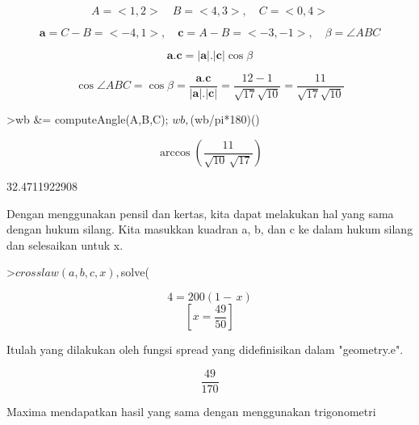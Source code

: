 \documentclass[a4paper,10pt]{article}
\begin{document}
\begin{eulernotebook}
\begin{eulercomment}
\begin{eulercomment}
\begin{eulercomment}
\begin{eulercomment}
\begin{eulercomment}
\end{eulercomment}
\begin{eulerformula}
\[
A=<1,2>\quad B=<4,3>,\quad C=<0,4>
\]
\end{eulerformula}
\begin{eulerformula}
\[
\mathbf{a}=C-B=<-4,1>,\quad \mathbf{c}=A-B=<-3,-1>,\quad \beta=\angle ABC
\]
\end{eulerformula}
\begin{eulerformula}
\[
\mathbf{a}.\mathbf{c}=|\mathbf{a}|.|\mathbf{c}|\cos \beta
\]
\end{eulerformula}
\begin{eulerformula}
\[
\cos \angle ABC =\cos\beta=\frac{\mathbf{a}.\mathbf{c}}{|\mathbf{a}|.|\mathbf{c}|}=\frac{12-1}{\sqrt{17}\sqrt{10}}=\frac{11}{\sqrt{17}\sqrt{10}}
\]
\end{eulerformula}
\begin{eulerprompt}
>wb &= computeAngle(A,B,C); $wb, $(wb/pi*180)()
\end{eulerprompt}
\begin{eulerformula}
\[
\arccos \left(\frac{11}{\sqrt{10}\,\sqrt{17}}\right)
\]
\end{eulerformula}
\begin{euleroutput}
  32.4711922908
\end{euleroutput}
\begin{eulercomment}
Dengan menggunakan pensil dan kertas, kita dapat melakukan hal yang
sama dengan hukum silang. Kita masukkan kuadran a, b, dan c ke dalam
hukum silang dan selesaikan untuk x.
\end{eulercomment}
\begin{eulerprompt}
>$crosslaw(a,b,c,x), $solve(%
\end{eulerprompt}
\begin{eulerformula}
\[
4=200\left(1-\,x\right)
\]
\[
\left[ x=\frac{49}{50} \right] 
\]
\end{eulerformula}
\begin{eulercomment}
Itulah yang dilakukan oleh fungsi spread yang didefinisikan dalam
"geometry.e".
\end{eulercomment}
\begin{eulerformula}
\[
\frac{49}{170}
\]
\end{eulerformula}
\begin{eulercomment}
Maxima mendapatkan hasil yang sama dengan menggunakan trigonometri

\end{eulercomment}
\end{eulercomment}
\end{eulercomment}
\end{eulercomment}
\end{eulercomment}
\end{eulernotebook}
\end{document}
